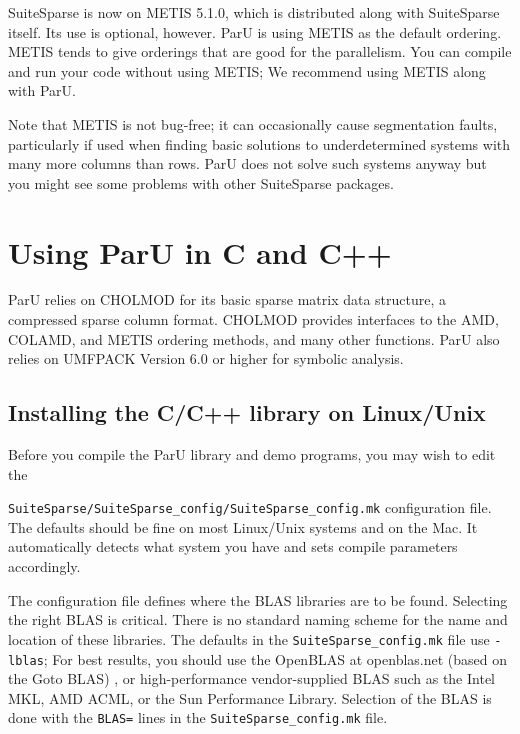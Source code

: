 \documentclass[12pt]{article}
\begin{document}
SuiteSparse is now on METIS 5.1.0, which is distributed along with
SuiteSparse itself.  Its use is optional, however. ParU is using METIS as the 
default ordering. METIS tends to give orderings that are good for the 
parallelism. You can compile and run your code without using METIS; We recommend 
using METIS along with ParU.

Note that METIS is not bug-free; it can occasionally cause segmentation 
faults, particularly if used when finding basic solutions to underdetermined 
systems with many more columns than rows. ParU does not solve such 
systems anyway but you might see some problems with other SuiteSparse packages.

\section{Using ParU in C and C++}

ParU relies on CHOLMOD for its basic sparse matrix data structure, a compressed 
sparse column format.  CHOLMOD provides interfaces to the AMD, COLAMD, and METIS
ordering methods, and many other functions. ParU also relies on UMFPACK Version 
6.0 or higher for symbolic analysis. 


\subsection{Installing the C/C++ library on Linux/Unix}

Before you compile the ParU library and demo programs, you may wish to
edit the 

\verb'SuiteSparse/SuiteSparse_config/SuiteSparse_config.mk' 
configuration file.  The defaults should be fine on most Linux/Unix systems and 
on the Mac.
It automatically detects what system you have and sets compile parameters
accordingly.

The configuration file defines where the BLAS libraries are to be
found.  Selecting the right BLAS is critical.  There is no standard naming
scheme for the name and location of these libraries.  The defaults in the
\verb'SuiteSparse_config.mk' file use \verb'-lblas';
For best results, you should use the OpenBLAS at openblas.net (based on the 
Goto BLAS) \cite{GotoVanDeGeijn08}, or high-performance vendor-supplied BLAS 
such as the Intel MKL, AMD ACML, or the Sun Performance Library.  Selection of 
the BLAS is done with the \verb'BLAS=' lines in the
\verb'SuiteSparse_config.mk' file.
\end{document}
